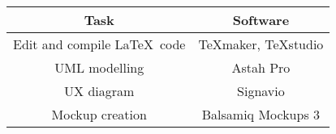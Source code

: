 \begin{center}
	
	\-\\
	\begin{tabular}{*{2}{c}}
		\toprule
		Task & Software \\
		\midrule
		Edit and compile \LaTeX\ code & TeXmaker, TeXstudio\\
		UML modelling & Astah Pro\\
		UX diagram & Signavio\\
		Mockup creation & Balsamiq Mockups 3\\
		\bottomrule
	\end{tabular}
\end{center}